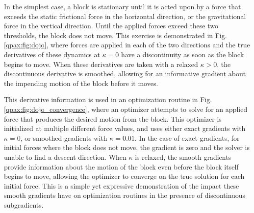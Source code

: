 In the simplest case, a block is stationary until it is acted upon by a force that exceeds the static frictional force in the horizontal direction, or the gravitational force in the vertical direction. Until the applied forces exceed these two thresholds, the block does not move. This exercise is demonstrated in Fig. \ref{qpax:fig:dojo}, where forces are applied in each of the two directions and the true derivatives of these dynamics at $\kappa=0$ have a discontinuity as soon as the block begins to move. When these derivatives are taken with a relaxed $\kappa > 0$, the discontinuous derivative is smoothed, allowing for an informative gradient about the impending motion of the block before it moves.

This derivative information is used in an optimization routine in Fig. \ref{qpax:fig:dojo_convergence}, where an optimizer attempts to solve for an applied force that produces the desired motion from the block. This optimizer is initialized at multiple different force values, and uses either exact gradients with $\kappa=0$, or smoothed gradients with $\kappa=0.01$. In the case of exact gradients, for initial forces where the block does not move, the gradient is zero and the solver is unable to find a descent direction. When $\kappa$ is relaxed, the smooth gradients provide information about the motion of the block even before the block itself begins to move, allowing the optimizer to converge on the true solution for each initial force. This is a simple yet expressive demonstration of the impact these smooth gradients have on optimization routines in the presence of discontinuous subgradients.

